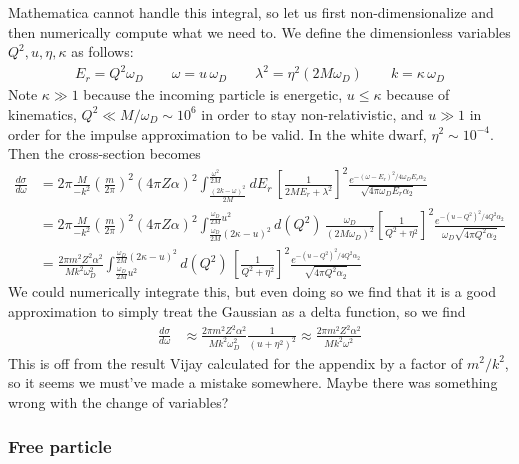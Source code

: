 \documentclass{article}
\begin{document}
Mathematica cannot handle this integral, so let us first non-dimensionalize and then numerically compute what we need to. We define the dimensionless variables $Q^2, u, \eta, \kappa$ as follows:
\begin{align}
E_r = Q^2 \omega_D \qquad \omega = u\, \omega_D \qquad \lambda^2 = \eta^2 (2 M \omega_D) \qquad k = \kappa\, \omega_D
\end{align}
Note $\kappa \gg 1$ because the incoming particle is energetic, $u\leq \kappa$ because of kinematics, $Q^2 \ll M / \omega_D \sim 10^6$ in order to stay non-relativistic, and $u\gg 1$ in order for the impulse approximation to be valid. In the white dwarf, $\eta^2 \sim 10^{-4}$. Then the cross-section becomes
\begin{align}
  \frac{d \sigma}{d \omega} &= 2 \pi \frac{M}{-k^2} \left( \frac{m}{2 \pi} \right)^2 \left( 4 \pi Z\alpha \right)^2 \int_{\frac{(2 k - \omega)^2}{2 M}}^{\frac{\omega^2}{2 M}} dE_r\, \left[ \frac{1}{2 M E_r + \lambda^2} \right]^2 \frac{e^{-(\omega - E_r)^2/4 \omega_DE_r \alpha_2}}{\sqrt{4 \pi \omega_D E_r \alpha_2}}  \nonumber\\
   &= 2 \pi \frac{M}{-k^2} \left( \frac{m}{2 \pi} \right)^2 \left( 4 \pi Z\alpha \right)^2 \int_{\frac{\omega_D}{2M}(2 \kappa - u)^2}^{\frac{\omega_D}{2M}u^2} d(Q^2)\, \frac{\omega_D}{(2 M\omega_D)^2} \left[ \frac{1}{Q^2 + \eta^2} \right]^2 \frac{e^{-(u - Q^2)^2/4 Q^2 \alpha_2}}{\omega_D \sqrt{4 \pi Q^2 \alpha_2}}  \nonumber\\
   &= \frac{2 \pi m^2 Z^2 \alpha^2}{Mk^2\omega_D^2} \int^{\frac{\omega_D}{2M}(2 \kappa - u)^2}_{\frac{\omega_D}{2M}u^2} d(Q^2)\, \left[ \frac{1}{Q^2 + \eta^2} \right]^2 \frac{e^{-(u - Q^2)^2/4 Q^2 \alpha_2}}{\sqrt{4 \pi Q^2 \alpha_2}}
\end{align}
We could numerically integrate this, but even doing so we find that it is a good approximation to simply treat the Gaussian as a delta function, so we find
\begin{align}
  \frac{d \sigma}{d \omega} &\approx \frac{2 \pi m^2 Z^2 \alpha^2}{Mk^2\omega_D^2} \frac{1}{(u + \eta^2)^2} \approx \frac{2 \pi m^2 Z^2 \alpha^2}{Mk^2\omega^2}
\end{align}
This is off from the result Vijay calculated for the appendix by a factor of $m^2 / k^2$, so it seems we must've made a mistake somewhere. Maybe there was something wrong with the change of variables?

\subsubsection{Free particle}
\end{document}
